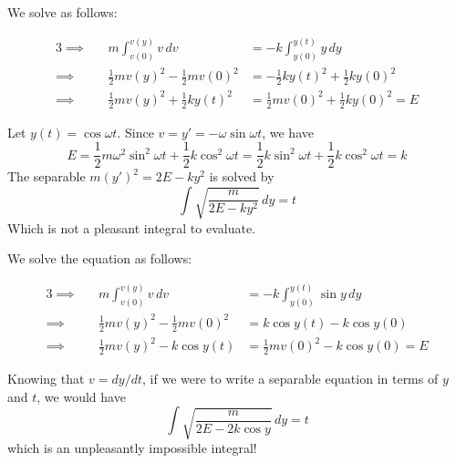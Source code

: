 \documentclass[a4paper]{article}
\begin{document}
We solve as follows:

\begin{alignat*}{3}
	\implies && m\int^{v \!\left( y \right) }_{v \!\left( 0 \right) } v \, dv & = -k \int^{y \!\left( t \right) }_{y \!\left( 0 \right) }  y \, dy   \\
	\implies && \frac{1}{2}mv \!\left( y \right) ^{2} - \frac{1}{2}mv \!\left( 0 \right)^{2} & = -\frac{1}{2}ky \!\left( t \right) ^{2} + \frac{1}{2}k y \!\left( 0 \right)^{2} \\
	\implies && \frac{1}{2} mv \!\left( y \right)^{2} + \frac{1}{2} k y \!\left( t \right)^{2} & = \frac{1}{2}m v \!\left( 0 \right)^{2} + \frac{1}{2} k y \!\left( 0 \right)^{2} = E
\end{alignat*}

Let \(y \!\left( t \right) = \cos \omega t\). Since \(v = y' = -\omega \sin \omega t\), we have
\[
	E = \frac{1}{2}m \omega^{2} \sin^{2} \omega t + \frac{1}{2} k \cos^{2} \omega t = \frac{1}{2} k \sin^{2} \omega t + \frac{1}{2} k \cos^{2} \omega t = k
\]
The separable \(m \!\left( y' \right)^{2} = 2E - ky^{2}\) is solved by
\[
	\int \sqrt{\frac{m}{2E - ky^{2}}} \, dy = t
\]
Which is not a pleasant integral to evaluate.

\vspace{12pt}


We solve the equation as follows:

\begin{alignat*}{3}
	\implies && m \int^{v \!\left( y \right) }_{v \!\left( 0 \right) } v \, dv   & = -k \int^{y \!\left( t \right) }_{y \!\left( 0 \right) } \sin y \, dy  \\
	\implies && \frac{1}{2}m v \!\left( y \right)^{2} - \frac{1}{2}m v \!\left( 0 \right)^{2} & = k \cos y \!\left( t \right) - k \cos y \!\left( 0 \right)  \\
	\implies && \frac{1}{2}m v \!\left( y \right)^{2} - k \cos y \!\left( t \right) & = \frac{1}{2}m v \!\left( 0 \right)^{2} - k \cos y \!\left( 0 \right) = E 
\end{alignat*}

Knowing that \(v = dy/dt\), if we were to write a separable equation in terms of \(y\) and \(t\), we would have
\[
	\int \sqrt{\frac{m}{2E - 2k \cos y}} \, dy = t
\]
which is an unpleasantly impossible integral!
\end{document}
